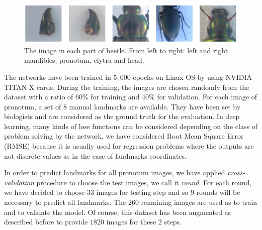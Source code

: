 \documentclass[review]{elsarticle}
\begin{document}
\begin{figure}[h]
	\centering
	\includegraphics[scale=0.25]{images/images5parts}
	\caption{The image in each part of beetle. From left to right:
          left and right mandibles, pronotum, elytra and head.}
	\label{fig5parts}
\end{figure}

The networks have been trained in $5, 000$ epochs on Linux OS by using
NVIDIA TITAN X cards. During the training, the images are chosen
randomly from the dataset with a ratio of $60\%$ for training and
$40\%$ for validation. For each image of pronotum, a set of $8$ manual
landmarks are available. They have been set by biologists and are
considered as the ground truth for the evaluation. In deep learning,
many kinds of loss functions can be considered depending on the
class of problem solving by the network, we have considered Root Mean
Square Error (RMSE) because it is usually used for regression problems
where the outputs are not discrete values as in the case of landmarks coordinates.


In order to predict landmarks for all pronotum images, we have applied
\textit{cross-validation} procedure to choose the test images, we call
it \textit{round}. For each round, we have decided to choose $33$
images for testing step and so $9$ rounds will be necessary to predict
all landmarks. The $260$ remaining images are used as
to train and to validate the model. Of course, this dataset has been
augmented as described before to provide $1820$ images for these $2$
steps.
\end{document}
